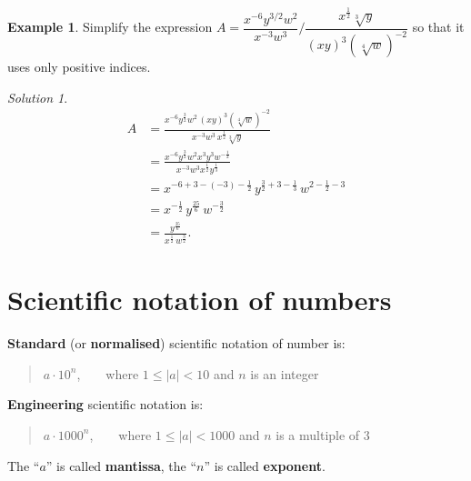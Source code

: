 \documentclass[
  english,
  12pt,
  oneside]{book}
\theoremstyle{definition}
\theoremstyle{definition}
\newtheorem{example}{Example}[chapter]
\theoremstyle{definition}
\theoremstyle{definition}
\theoremstyle{remark}
\newtheorem*{solution}{Solution}
\begin{document}
\begin{example}
Simplify the expression \(A=\dfrac{x^{-6}y^{3/2}w^2}{x^{-3}w^3}/\dfrac{x^\frac12\sqrt[3]{y}}{(xy)^3(\sqrt[4]{w})^{-2}}\) so that it uses only positive indices.
\end{example}

\begin{solution}
\begin{align*}
A&= \frac{x^{-6}y^{\frac{3}{2}}w^2\,(xy)^3(\sqrt[4]{w})^{-2}}{x^{-3}w^3\, x^{\frac{1}{2}}\sqrt[3]{y}}\\
&=\frac{x^{-6}y^{\frac{3}{2}}w^2x^3y^3w^{-\frac12}}{x^{-3}w^3x^{\frac12}y^{\frac13}}\\
&=x^{-6+3-(-3)-\frac12}\,y^{\frac32+3-\frac13}\, w^{2-\frac12-3}\\
&=x^{-\frac12}\,y^{\frac{25}{6}}\,w^{-\frac32}\\
&=\frac{y^{\frac{25}{6}}}{x^{\frac12}\,w^{\frac32}}.
\end{align*}
\end{solution}

\section{Scientific notation of numbers}\label{scientific-notation-of-numbers}

\textbf{Standard} (or \textbf{normalised}) scientific notation of number is:

\begin{quote}
\(a\cdot 10^n\), ~ ~ where \(1\leq|a|<10\) and \(n\) is an integer
\end{quote}

\textbf{Engineering} scientific notation is:

\begin{quote}
\(a\cdot 1000^n\), ~ ~ where \(1\leq|a|<1000\) and \(n\) is a multiple of \(3\)
\end{quote}

The ``\(a\)'' is called \textbf{mantissa}, the ``\(n\)'' is called \textbf{exponent}.
\end{document}
